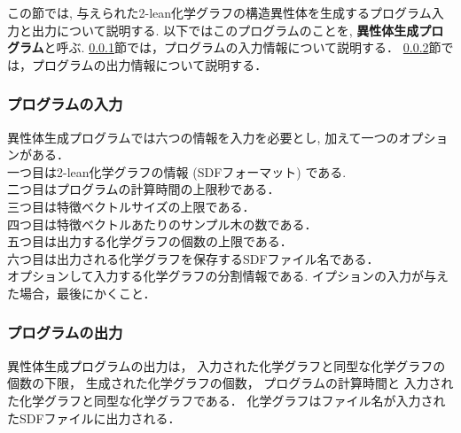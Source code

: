 \documentclass[11pt,titlepage,dvipdfmx,twoside]{jarticle}
\begin{document}
この節では, 与えられた2-lean化学グラフの構造異性体を生成するプログラム入力と出力について説明する.
以下ではこのプログラムのことを, {\bf 異性体生成プログラム}と呼ぶ.
\ref{sec:Input_m}節では，プログラムの入力情報について説明する．
\ref{sec:Output_m}節では，プログラムの出力情報について説明する．

\subsubsection{プログラムの入力}
\label{sec:Input_m}



異性体生成プログラムでは六つの情報を入力を必要とし, 加えて一つのオプションがある．\\
一つ目は2-lean化学グラフの情報 (SDFフォーマット) である.\\
二つ目はプログラムの計算時間の上限秒である．\\
三つ目は特徴ベクトルサイズの上限である．\\
四つ目は特徴ベクトルあたりのサンプル木の数である．\\
五つ目は出力する化学グラフの個数の上限である．\\
六つ目は出力される化学グラフを保存するSDFファイル名である．\\
オプションして入力する化学グラフの分割情報である.
イプションの入力が与えた場合，最後にかくこと．

\bigskip





\subsubsection{プログラムの出力}
\label{sec:Output_m}

異性体生成プログラムの出力は，
入力された化学グラフと同型な化学グラフの個数の下限，
生成された化学グラフの個数，
プログラムの計算時間と
入力された化学グラフと同型な化学グラフである．
化学グラフはファイル名が入力されたSDFファイルに出力される．
\end{document}
